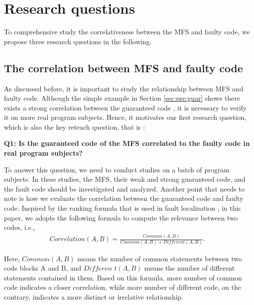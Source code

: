 \documentclass{sig-alternate-05-2015}
\begin{document}



\section{Research questions} \label{sec:research}
To comprehensive study the correlativeness between the MFS and faulty code, we propose three research questions in the following.

\subsection{The correlation between MFS and faulty code}
As discussed before, it is important to study the relationship between MFS and faulty code. Although the simple example in Section \ref{sec:pre:guar} shows there exists a strong correlation between the guaranteed code , it is necessary to verify it on more real program subjects. Hence, it motivates our first research question, which is also the key reteach question, that is :

\textbf{Q1: Is the guaranteed code of the MFS correlated to the faulty code in real program subjects?}

To answer this question, we need to conduct studies on a batch of program subjects. In these studies, the MFS, their weak and strong guaranteed code, and the fault code should be investigated and analyzed. Another point that needs to note is how we evaluate the correlation between the guaranteed code and faulty code. Inspired by the ranking formula that is used in fault localization \cite{naish2011model,abreu2007accuracy}, in this paper, we adopts the following  formula to compute the relevance between two codes, i.e.,
 \begin{equation}\begin{aligned}\label{eq:metric}
 Correlation (A, B)= \frac{Common(A, B)}{Common(A, B) + Different(A, B)} .\end{aligned} \end{equation}

Here, $Common(A, B)$ means the number of common statements between two code blocks A and B, and $Differen$ $t (A, B)$ means the number of different statements contained in them. Based on this formula, more number of common code indicates a closer correlation, while more number of different code, on the contrary, indicates a more distinct or irrelative relationship.
\end{document}
